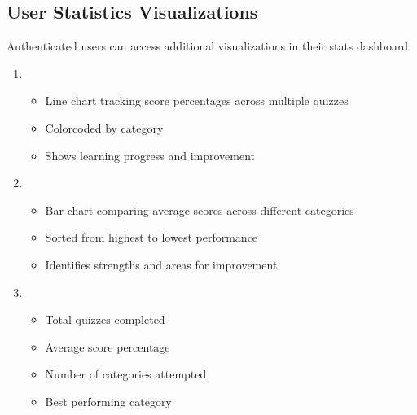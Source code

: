 \documentclass[letterpaper,10pt,english]{sphinxmanual}
\begin{document}
\subsection{User Statistics Visualizations}
\label{\detokenize{analytics:user-statistics-visualizations}}
\sphinxAtStartPar
Authenticated users can access additional visualizations in their stats dashboard:
\begin{enumerate}
%
\item {} 
\sphinxAtStartPar
{}
\begin{itemize}
\item {} 
\sphinxAtStartPar
Line chart tracking score percentages across multiple quizzes

\item {} 
\sphinxAtStartPar
Color\sphinxhyphen{}coded by category

\item {} 
\sphinxAtStartPar
Shows learning progress and improvement

\end{itemize}

\item {} 
\sphinxAtStartPar
{}
\begin{itemize}
\item {} 
\sphinxAtStartPar
Bar chart comparing average scores across different categories

\item {} 
\sphinxAtStartPar
Sorted from highest to lowest performance

\item {} 
\sphinxAtStartPar
Identifies strengths and areas for improvement

\end{itemize}

\item {} 
\sphinxAtStartPar
{}
\begin{itemize}
\item {} 
\sphinxAtStartPar
Total quizzes completed

\item {} 
\sphinxAtStartPar
Average score percentage

\item {} 
\sphinxAtStartPar
Number of categories attempted

\item {} 
\sphinxAtStartPar
Best performing category

\end{itemize}

\end{enumerate}
\end{document}
